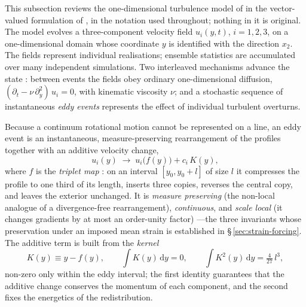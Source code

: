 \documentclass[lineno]{JFM-FLM_Au}
\providecommand{\DIFadd}[1]{{\protect\color{blue}\uwave{#1}}} %
\providecommand{\DIFaddbegin}{} %
\providecommand{\DIFaddend}{} %
\begin{document}
\DIFaddend This subsection reviews the one-dimensional turbulence model of
\citet{Kerstein1999} in the vector-valued formulation of
\citet{Kerstein2001}, in the notation used throughout; nothing in it is
original. The model evolves a three-component velocity field $u_i(y,t)$,
$i=1,2,3$, on a one-dimensional domain whose coordinate $y$ is identified
with the direction $x_2$. The fields represent individual realisations;
ensemble statistics are accumulated over many independent simulations.
Two interleaved mechanisms advance the state
\DIFaddbegin \DIFadd{(figure~\ref{fig:odt-schematic})}\DIFaddend : between events the fields
obey ordinary one-dimensional diffusion,
$(\partial_t-\nu\,\partial_y^2)\,u_i=0$, with kinematic viscosity $\nu$;
and a stochastic sequence of instantaneous \emph{eddy events} represents
the effect of individual turbulent overturns.


Because a continuum rotational motion cannot be represented on a line, an
eddy event is an instantaneous, measure-preserving rearrangement of the
profiles together with an additive velocity change,
\begin{equation}
  u_i(y)\;\longrightarrow\;u_i\!\big(f(y)\big)+c_i\,K(y),
  \label{eq:event}
\end{equation}
where $f$ is the \emph{triplet map}
\citep{Kerstein1991,Kerstein1999}: on an interval $[y_0,y_0+l]$ of size
$l$ it compresses the profile to one third of its length, inserts three
copies, reverses the central copy, and leaves the exterior unchanged.
It is \emph{measure preserving} (the non-local analogue of a
divergence-free rearrangement), \emph{continuous}, and \emph{scale
local} (it changes gradients by at most an order-unity factor)
\citep{Kerstein2001}---the
three invariants whose preservation under an imposed mean strain is
established in \S\,\ref{sec:strain-forcing}. The additive term is built
from the \emph{kernel}
\begin{equation}
  K(y)\equiv y-f(y),
  \qquad
  \int K(y)\,\mathrm{d}y = 0,
  \qquad
  \int K^2(y)\,\mathrm{d}y = \tfrac{4}{27}\,l^{3},
  \label{eq:kernel-identities}
\end{equation}
non-zero only within the eddy interval; the first identity guarantees
that the additive change conserves the momentum of each component, and
the second fixes the energetics of the redistribution.
\end{document}
